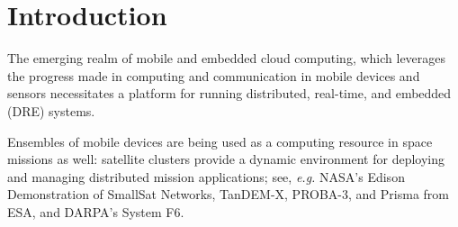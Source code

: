 \vspace{-0.1in}
\section{Introduction}
\label{sec:intro}

The emerging realm of mobile and embedded cloud computing, which
leverages the progress made in computing and communication
in mobile devices and sensors necessitates a platform for running distributed, 
real-time, and embedded (DRE) systems.  
\iffalse
For example, an ad-hoc cloud of smart phones can share
sensing and computing resources with nearby devices to provide increased
situational awareness in disaster relief efforts.  
\fi
Ensembles of mobile
devices are being used as a computing resource in space missions as
well: satellite clusters provide a dynamic environment for deploying and 
managing distributed mission applications; see, \emph{e.g.} NASA's Edison Demonstration of SmallSat Networks,
TanDEM-X, PROBA-3, and Prisma from ESA, and DARPA's System F6.

\iffalse
DRE systems deployed in these shared environments often require the
presence of one or more mixed criticality applications, potentially
sourced from various vendors, to handle multiple complex activities.  
These applications, containing multiple processes
of different criticality, require strict isolation with respect to resource
guarantees, faults, and security.  Such requirements imply
that an application's performance, faults, or life cycle changes
should not impact in any way an application in another isolation
group. This isolation requirement adds the complexity of application
management to these DRE systems.
\fi

\iffalse
Such strict
partitioning, though useful in isolation, is often inefficient because
tasks are guaranteed processor time even when they do not need it.
Furthermore, strict partitioning cannot execute sporadic critical tasks
that must execute immediately.  
Additionally, different sets of applications can be configured to be scheduled at different phases of the mission.
 These events call for dynamic changes to the
scheduling of DRE system tasks.
\fi

